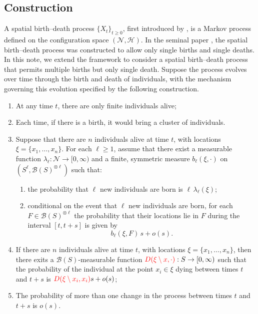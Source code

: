 \documentclass[12pt]{article}
\newcommand{\red}[1]{\textcolor{red}{#1}}
\newcounter{con}%
\numberwithin{equation}{section}
\begin{document}
\subsection{Construction}
A spatial birth--death process $\{X_t\}_{t\ge0}$, first introduced by \cite{Preston75}, is a Markov process defined on the configuration space $(\mathcal{N},\mathscr{H})$.
In the seminal paper \cite{Preston75}, the spatial birth--death process was constructed to allow only single births and single deaths. 
In this note, we extend the framework to consider a spatial birth--death process that permits multiple births but only single death.
Suppose the process evolves over time through the birth and death of individuals, with the mechanism governing this evolution specified by the following construction.
\begin{enumerate}
	\item At any time $t$, there are only finite individuals alive;
	\item Each time, if there is a birth, it would bring a cluster of individuals.

\item Suppose that there are $n$ individuals alive at time $t$, with locations 
$\xi = \{x_1, \dots, x_n\}$. For each $\ell \ge 1$, assume that there exist 
a measurable function $\lambda_\ell : \mathcal{N} \to [0, \infty)$ and 
a finite, symmetric measure $b_\ell(\xi, \cdot)$ on 
$(S^\ell, \mathscr{B}(S)^{\otimes \ell})$ such that:
\begin{enumerate}
  \item[i)] the probability that $\ell$ new individuals are born is 
  $\ell\, \lambda_\ell(\xi)$;
  \item[ii)] conditional on the event that $\ell$ new individuals are born, 
  for each $F \in \mathscr{B}(S)^{\otimes \ell}$ the probability that their 
  locations lie in $F$ during the interval $[t, t+s]$ is given by
  \[
    b_\ell(\xi, F)\, s + o(s).
  \]
\end{enumerate}
\item If there are $n$ individuals alive at time $t$, with locations $\xi=\{x_1,\dots,x_n\}$, then there exits a $\mathscr{B}(S)$-measurable function $\red{D(\xi\setminus x,\cdot)}: S\to[0,\infty)$ such that the probability of the individual at the point $x_i\in\xi$ dying between times $t$ and $t+s$ is $\red{D(\xi\setminus x_i,x_i)}s+o(s)$;
	\item The probability of more than one change in the process between times $t$ and $t+s$ is $o(s)$.
\end{enumerate}
\end{document}

